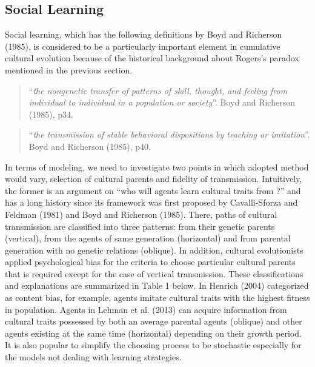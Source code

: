 \documentclass[a4paper, dvipdfmx]{article}
\begin{document}
\subsection*{Social Learning}
Social learning, which has the following definitions by Boyd and Richerson (1985), is considered to be a particularly important element in cumulative cultural evolution because of the historical background about Rogers's paradox mentioned in the previous section.

\begin{quotation}
    “{\it the nongenetic transfer of patterns of skill, thought, and feeling from individual to individual in a population or society}”. Boyd and Richerson (1985), p34.
\end{quotation}
\begin{quotation}
    “{\it the transmission of stable behavioral dispositions by teaching or imitation}”. Boyd and Richerson (1985), p40.
\end{quotation}

\noindent In terms of modeling, we need to investigate two points in which adopted method would vary, selection of cultural parents and fidelity of transmission. Intuitively, the former is an argument on “who will agents learn cultural traits from ?” and has a long history since its framework was first proposed by Cavalli-Sforza and Feldman (1981) and Boyd and Richerson (1985). There, paths of cultural transmission are classified into three patterns: from their genetic parents (vertical), from the agents of same generation (horizontal) and from parental generation with no genetic relations (oblique). In addition, cultural evolutionists applied psychological bias for the criteria to choose particular cultural parents that is required except for the case of vertical transmission. These classifications and explanations are summarized in Table 1 below. In Henrich (2004) categorized as content bias, for example, agents imitate cultural traits with the highest fitness in population. Agents in Lehman et al. (2013) can acquire information from cultural traits possessed by both an average parental agents (oblique) and other agents existing at the same time (horizontal) depending on their growth period. It is also popular to simplify the choosing process to be stochastic especially for the models not dealing with learning strategies.
\end{document}
